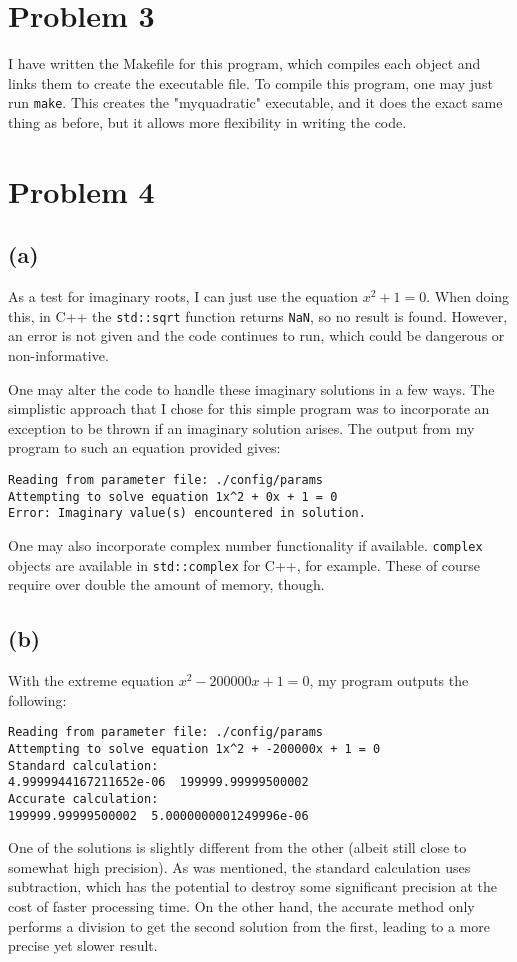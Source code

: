\documentclass[12pt]{article}
\begin{document}
\section*{Problem 3}

I have written the Makefile for this program, which compiles each object and
links them to create the executable file. To compile this program, one may just
run \texttt{make}. This creates the "myquadratic" executable, and it does the
exact same thing as before, but it allows more flexibility in writing the code.

\section*{Problem 4}

\subsection*{(a)}

As a test for imaginary roots, I can just use the equation $x^2 + 1 = 0$. When
doing this, in C++ the \texttt{std::sqrt} function returns \texttt{NaN}, so no
result is found. However, an error is not given and the code continues to run,
which could be dangerous or non-informative.

One may alter the code to handle these imaginary solutions in a few ways. The
simplistic approach that I chose for this simple program was to incorporate an
exception to be thrown if an imaginary solution arises. The output from my
program to such an equation provided gives:
\begin{verbatim}
Reading from parameter file: ./config/params
Attempting to solve equation 1x^2 + 0x + 1 = 0
Error: Imaginary value(s) encountered in solution.
\end{verbatim}

One may also incorporate complex number functionality if available.
\texttt{complex} objects are available in \texttt{std::complex} for C++, for
example. These of course require over double the amount of memory, though.

\subsection*{(b)}

With the extreme equation $x^2 - 200000x + 1 = 0$, my program outputs the
following:
\begin{verbatim}
Reading from parameter file: ./config/params
Attempting to solve equation 1x^2 + -200000x + 1 = 0
Standard calculation:
4.9999944167211652e-06  199999.99999500002
Accurate calculation:
199999.99999500002  5.0000000001249996e-06
\end{verbatim}
One of the solutions is slightly different from the other (albeit still close
to somewhat high precision). As was mentioned, the standard calculation uses
subtraction, which has the potential to destroy some significant precision at
the cost of faster processing time. On the other hand, the accurate method only
performs a division to get the second solution from the first, leading to a
more precise yet slower result.
\end{document}
